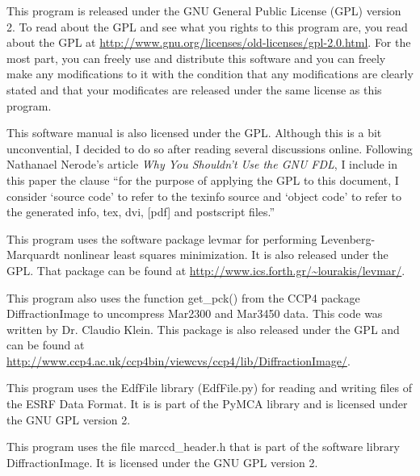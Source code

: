This program is released under the GNU General
Public License (GPL) version 2.
To read about
the GPL and see what you rights to this program are,
you read about the GPL at
\url{http://www.gnu.org/licenses/old-licenses/gpl-2.0.html}.
For the most part, you can freely use and distribute 
this software and you can freely make any modifications to 
it with the condition that any modifications are clearly stated 
and that your modificates are released under the same license as
this program.

This software manual is also licensed under the GPL. Although
this is a bit unconvential, I decided to do so after reading
several discussions online. Following Nathanael Nerode's 
article {\em Why You Shouldn't Use the GNU FDL}, I include in
this paper the clause ``for the purpose of applying the GPL to 
this document, I consider `source code' to refer to the texinfo 
source and `object code' to refer to the generated info, tex, 
dvi, [pdf] and postscript files.''\cite{Nerode03}

This program uses the software package
levmar for performing Levenberg-Marquardt nonlinear
least squares minimization.
It is also released under the GPL. That package can be 
found at \url{http://www.ics.forth.gr/~lourakis/levmar/}.\cite{lourakis04LM}

This program also uses the function get\_pck() from the CCP4 package
DiffractionImage to uncompress Mar2300 and Mar3450 data. This code was
written by Dr. Claudio Klein. This package is 
also released under the GPL and can be found at
\url{http://www.ccp4.ac.uk/ccp4bin/viewcvs/ccp4/lib/DiffractionImage/}.\cite{Klein95}

This program uses the EdfFile library (EdfFile.py) for reading and 
writing files of the ESRF Data Format. It is is part of the PyMCA 
library and is licensed under the GNU GPL version 2.\cite{PyMCA}

This program uses the file marccd\_header.h that is part of the
software library DiffractionImage. It is licensed under
the GNU GPL version 2.\cite{DiffractionImage}


